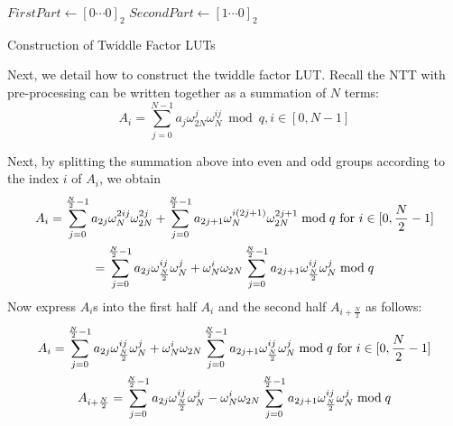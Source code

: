 \documentclass[submission]{iacrtrans}
\theoremstyle{plain}
\begin{document}
\begin{algorithm}[!tbh]
 \DontPrintSemicolon %
    $FirstPart \gets [0\cdots0]_2$\;{}
    $SecondPart \gets [1\cdots0]_2$\;
 \caption{Construction of Twiddle Factor LUTs}\label{alg:descript_twiddlefactor}
\end{algorithm}

Next, we detail how to construct the twiddle factor LUT. Recall the NTT with pre-processing can be written together as a summation of $N$ terms:
\[
    A_i = \sum_{j=0}^{N-1}a_j\omega_{2N}^j\omega_N^{ij} \bmod q, i\in [0,N-1]
\]

Next, by splitting the summation above into even and odd groups according to the index $i$ of $A_i$, we obtain
\begin{gather}
    A_i = \sum_{j=0}^{\frac{N}{2}-1}a_{2j}\omega_N^{2ij}\omega_{2N}^{2j}  + \sum_{j=0}^{\frac{N}{2}-1}a_{2j+1}\omega_N^{i(2j+1)}\omega_{2N}^{2j+1} \bmod q \text{ for } i\in [0,\frac{N}{2}-1]\notag\\
    = \sum_{j=0}^{\frac{N}{2}-1}a_{2j}\omega_{\frac{N}{2}}^{ij}\omega_{N}^{j}  + \omega_{N}^i\omega_{2N}\sum_{j=0}^{\frac{N}{2}-1}a_{2j+1}\omega_{\frac{N}{2}}^{ij}\omega_N^{j} \bmod q \notag
\end{gather}
Now express $A_i$s into the first half $A_{i}$ and the second half $A_{i+\frac{N}{2}}$ as follows: 
\begin{gather}
    A_i = \sum_{j=0}^{\frac{N}{2}-1}a_{2j}\omega_{\frac{N}{2}}^{ij}\omega_{N}^{j}  + \omega_{N}^i\omega_{2N}\sum_{j=0}^{\frac{N}{2}-1}a_{2j+1}\omega_{\frac{N}{2}}^{ij}\omega_N^{j} \bmod q \text{ for } i\in [0,\frac{N}{2}-1]\notag\\
   A_{i+\frac{N}{2}} = \sum_{j=0}^{\frac{N}{2}-1}a_{2j}\omega_{\frac{N}{2}}^{ij}\omega_{N}^{j}  - \omega_{N}^i\omega_{2N}\sum_{j=0}^{\frac{N}{2}-1}a_{2j+1}\omega_{\frac{N}{2}}^{ij}\omega_N^{j} \bmod q \notag
\end{gather}
\end{document}
